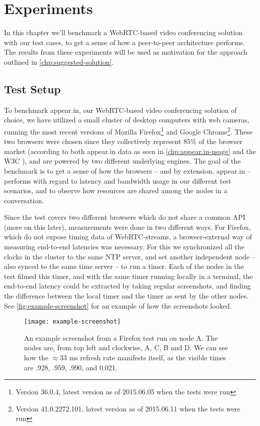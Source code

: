 \chapter{Experiments}\label{chp:experiments}

In this chapter we'll benchmark a WebRTC-based video conferencing solution with our test cases, to get a sense of how a peer-to-peer architecture performs. The results from these experiments will be used as motivation for the approach outlined in \autoref{chp:suggested-solution}.


\section{Test Setup}

To benchmark appear.in, our WebRTC-based video conferencing solution of choice, we have utilized a small cluster of desktop computers with web cameras, running the most recent versions of Mozilla Firefox\footnote{Version 36.0.4, latest version as of 2015.06.05 when the tests were run} and Google Chrome\footnote{Version 41.0.2272.101, latest version as of 2015.06.11 when the tests were run}. These two browsers were chosen since they collectively represent 85\% of the browser market (according to both appear.in data as seen in \autoref{chp:appear.in-usage} and the W3C \cite{browser-stats}), and are powered by two different underlying engines. The goal of the benchmark is to get a sense of how the browsers -- and by extension, appear.in -- performs with regard to latency and bandwidth usage in our different test scenarios, and to observe how resources are shared among the nodes in a conversation.

Since the test covers two different browsers which do not share a common API (more on this later), measurements were done in two different ways. For Firefox, which do not expose timing data of WebRTC-streams, a browser-external way of measuring end-to-end latencies was necessary. For this we synchronized all the clocks in the cluster to the same \gls{NTP} server, and set another independent node -- also synced to the same time server -- to run a timer. Each of the nodes in the test filmed this timer, and with the same timer running locally in a terminal, the end-to-end latency could be extracted by taking regular screenshots, and finding the difference between the local timer and the timer as sent by the other nodes. See \autoref{fig:example-screenshot} for an example of how the screenshots looked.

\begin{figure}
    \centering
    \texttt{[image: example-screenshot]}
    \caption{An example screenshot from a Firefox test run on node A. The nodes are, from top left and clockwise, A, C, B and D. We can see how the $\approx$33 ms refresh rate manifests itself, as the visible times are .928, .959, .990, and 0.021.}
    \label{fig:example-screenshot}
\end{figure}

